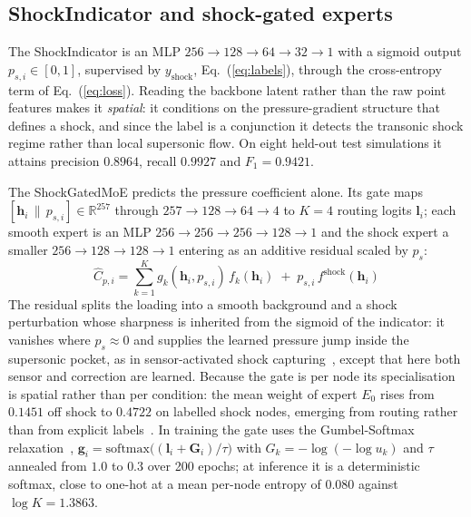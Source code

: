 \documentclass{WCCM-ECCOMAS_2026_Full_Paper}
\begin{document}
\subsection{ShockIndicator and shock-gated experts}
\label{sec:moe}

The ShockIndicator is an MLP $256\!\to\!128\!\to\!64\!\to\!32\!\to\!1$
with a sigmoid output $p_{s,i}\in[0,1]$, supervised by
$y_{\mathrm{shock}}$, Eq.~(\ref{eq:labels}), through the cross-entropy
term of Eq.~(\ref{eq:loss}).  Reading the backbone latent rather than
the raw point features makes it \emph{spatial}: it conditions on the
pressure-gradient structure that defines a shock, and since the label
is a conjunction it detects the transonic shock regime rather than
local supersonic flow.  On eight held-out test simulations it attains
precision $0.8964$, recall $0.9927$ and $F_1 = 0.9421$.

The ShockGatedMoE predicts the pressure coefficient alone.  Its gate
maps $[\mathbf{h}_i\,\|\,p_{s,i}]\in\mathbb{R}^{257}$ through
$257\!\to\!128\!\to\!64\!\to\!4$ to $K=4$ routing logits
$\mathbf{l}_i$; each smooth expert is an MLP
$256\!\to\!256\!\to\!256\!\to\!128\!\to\!1$ and the shock expert a
smaller $256\!\to\!128\!\to\!128\!\to\!1$ entering as an additive
residual scaled by $p_s$:
\begin{equation}
  \hat{C}_{p,i} =
    \sum_{k=1}^{K} g_{k}(\mathbf{h}_i, p_{s,i})\, f_{k}(\mathbf{h}_i)
    \;+\; p_{s,i}\, f^{\mathrm{shock}}(\mathbf{h}_i)
  \label{eq:forward_cp}
\end{equation}
The residual splits the loading into a smooth background and a shock
perturbation whose sharpness is inherited from the sigmoid of the
indicator: it vanishes where $p_s\!\approx\!0$ and supplies the learned
pressure jump inside the supersonic pocket, as in sensor-activated
shock capturing~\cite{Discacciati2020}, except that here both sensor
and correction are learned.  Because the gate is per node its
specialisation is spatial rather than per condition: the mean weight
of expert $E_0$ rises from $0.1451$ off shock to $0.4722$ on labelled
shock nodes, emerging from routing rather than from explicit
labels~\cite{Jacobs1991,Shazeer2017}.  In training the gate uses the
Gumbel-Softmax relaxation~\cite{Jang2017},
$\mathbf{g}_i = \mathrm{softmax}\bigl((\mathbf{l}_i+\mathbf{G}_i)/
\tau\bigr)$ with $G_k = -\log(-\log u_k)$ and $\tau$ annealed from
$1.0$ to $0.3$ over 200 epochs; at inference it is a deterministic
softmax, close to one-hot at a mean per-node entropy of $0.080$
against $\log K = 1.3863$.
\end{document}
